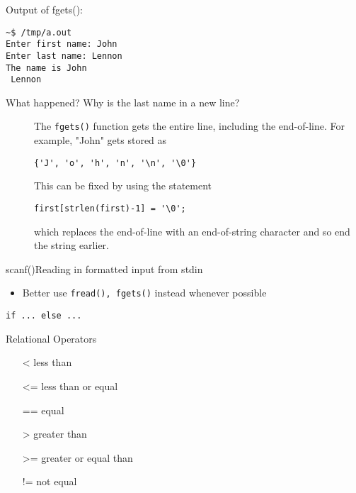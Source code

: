 Output of fgets():
\begin{verbatim}
~$ /tmp/a.out
Enter first name: John
Enter last name: Lennon
The name is John
 Lennon
\end{verbatim}

\begin{description}
\item[What happened? Why is the last name in a new line?]  The \texttt{fgets()} function gets the
  entire line, including the end-of-line. For example, "John" gets stored as
\begin{verbatim}
{'J', 'o', 'h', 'n', '\n', '\0'}
\end{verbatim}
  This can be fixed by using the statement
\begin{verbatim}
first[strlen(first)-1] = '\0';
\end{verbatim}
  which replaces the end-of-line with an end-of-string character and so end the string
  earlier.
\end{description}

\begin{frame}{scanf()}{Reading in formatted input from stdin}
  \begin{iblock}{}
    \begin{center}
    \end{center}
  \end{iblock}
  \begin{itemize}
  \item Better use \texttt{fread(), fgets()} instead whenever possible
  \end{itemize}
\end{frame}

\begin{frame}{\texttt{if ... else ...}}
\end{frame}

\begin{frame}{Relational Operators}
  \begin{multicols}{2}
    \begin{itemize}
    \item[<] less than
    \item[<=] less than or equal
    \item[==] equal
    \item[>] greater than
    \item[>=] greater or equal than
    \item[!=] not equal
    \end{itemize}
  \end{multicols}
\end{frame}

